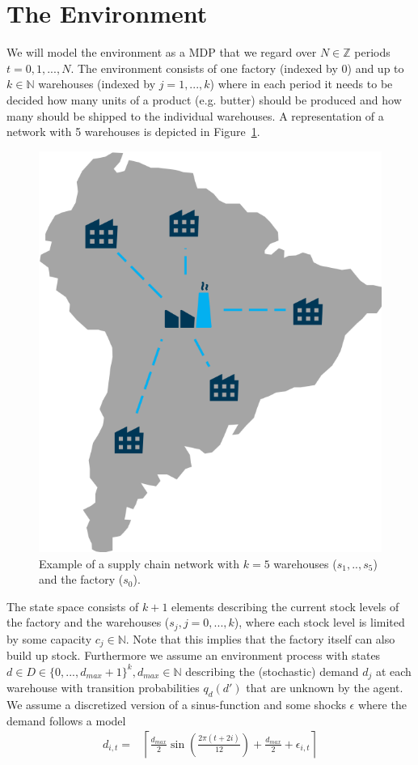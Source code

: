 \documentclass[journal, a4paper]{IEEEtran}
\theoremstyle{plain}
\theoremstyle{definition}
\begin{document}
\section{The Environment}
\label{sec:env}
We will model the environment as a MDP that we regard over $N \in \mathbb{Z}$ periods $t = 0, 1, ..., N$. The environment consists of one factory (indexed by $0$) and up to $k \in \mathbb{N}$ warehouses (indexed by $j=1,...,k$) where in each period it needs to be decided how many units of a product (e.g. butter) should be produced and how many should be shipped to the individual warehouses. A representation of a network with 5 warehouses is depicted in Figure~\ref{model_example}. 
\begin{figure}[h]
	\centering
	\includegraphics[width=0.4\columnwidth]{model.png}
	\caption{\label{model_example}Example of a supply chain network with $k=5$ warehouses ($s_1, .., s_5$) and the factory ($s_0$).}
\end{figure}
The state space consists of $k+1$ elements describing the current stock levels of the factory and the warehouses ($s_j, j=0,...,k$), where each stock level is limited by some capacity $c_j \in \mathbb{N}$. Note that this implies that the factory itself can also build up stock. Furthermore we assume an environment process with states $d \in D \in \{0,..., d_{max}+1\}^k, d_{max} \in \mathbb{N}$ describing the (stochastic) demand $d_j$ at each warehouse with transition probabilities $q_d(d')$ that are unknown by the agent. We assume a discretized version of a sinus-function and some shocks $\epsilon$ where the demand follows a model 
\begin{equation}
	\begin{split}
		d_{i,t} = &\left\lceil \frac{d_{max}}{2} \sin\left( \frac{2 \pi (t + 2i) }{12}\right) + \frac{d_{max}}{2} + \epsilon_{i,t} \right\rceil
	\end{split}
\end{equation}
\end{document}
